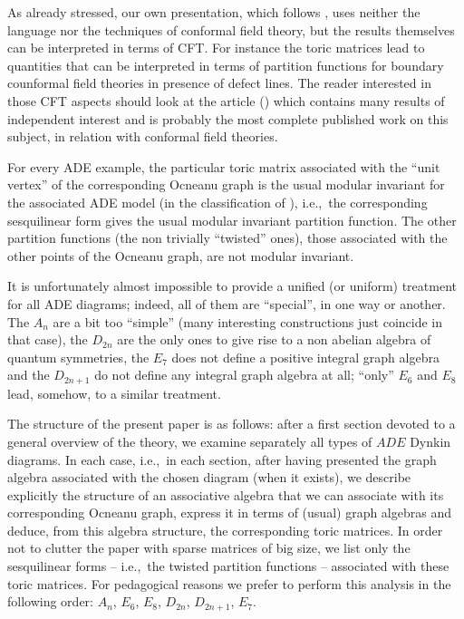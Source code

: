 \documentclass[a4paper,11pt]{article}
\def\ie{{\rm i.e.,\/}\ }
\begin{document}
As already stressed, our own 
presentation, which follows \cite{Coque:qtetra}, uses neither the 
language nor the techniques  of conformal field theory, but 
the results themselves can be interpreted in terms of CFT. For 
instance the toric matrices lead to quantities that can be
interpreted in terms of partition functions for boundary counformal 
field theories in presence of defect lines. The reader interested in 
those CFT aspects should look at the article (\cite{PetZub:Oc}) which contains
many results of independent interest and is
probably the most complete published work on this subject, in
relation with conformal field theories. 

For every ADE example, the particular toric matrix associated with the 
``unit vertex''  
of the corresponding Ocneanu graph is the usual modular invariant for the 
associated  
ADE model (in the classification of \cite{CapItzZub}), \ie the
corresponding sesquilinear form gives the usual modular invariant partition
function. The other partition functions (the non trivially ``twisted''
ones), those associated with the other points of the Ocneanu graph,
are not modular invariant.


It is unfortunately almost impossible to provide a unified (or
uniform) treatment for all ADE diagrams; indeed, all of them are
``special'', in one way or another. The $A_{n}$ are a bit too
``simple'' (many interesting constructions just coincide in that
case), the $D_{2n}$ are the only ones to give rise to a non abelian
algebra of quantum symmetries, the $E_{7}$ does not define a positive
integral graph algebra and the $D_{2n+1}$ do not define any integral
graph algebra at all; ``only'' $E_{6}$ and $E_{8}$ lead, somehow, to
a similar
treatment.

The structure of the present paper is as follows:
after a first section devoted to a general overview of the theory, we
examine separately all types of $ADE$ Dynkin diagrams. In each case,
\ie in each section, after having presented the graph algebra associated
with the chosen diagram (when it exists), we describe
explicitly the structure of an associative algebra that we can
associate with its corresponding Ocneanu graph, express it
in terms of (usual) graph algebras and deduce, from this
algebra structure, the corresponding toric matrices.
In order not to clutter the paper with sparse matrices of big size,
we list only the
sesquilinear forms -- \ie the twisted partition functions --
associated with these toric matrices. For pedagogical reasons we prefer to
perform this analysis in the following order: $A_n$, $E_{6}$, $E_{8}$,
       $D_{2n}$, $D_{2n+1}$, $E_{7}$.
\end{document}
